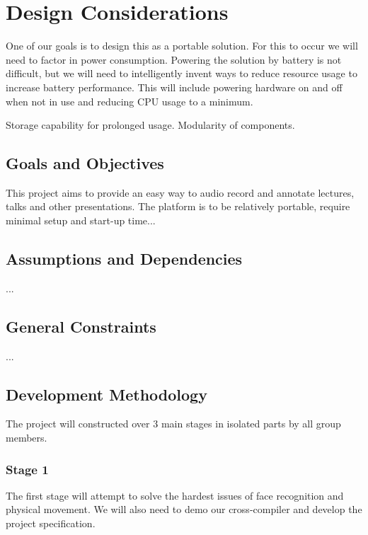 \documentclass[11pt,a4paper,titlepage]{report}
\begin{document}
\section{Design Considerations}

One of our goals is to design this as a portable solution. For this to occur we will need to factor in power consumption. Powering the solution by battery is not difficult, but we will need to intelligently invent ways to reduce resource usage to increase battery performance. This will include powering hardware on and off when not in use and reducing CPU usage to a minimum. 

Storage capability for prolonged usage. Modularity of components.


\subsection{Goals and Objectives}

This project aims to provide an easy way to audio record and annotate lectures, talks and other presentations. The platform is to be relatively portable, require minimal setup and start-up time...

\subsection{Assumptions and Dependencies}

...

\subsection{General Constraints}

...

\subsection{Development Methodology}

The project will constructed over 3 main stages in isolated parts by all group members. 


\subsubsection{Stage 1}

The first stage will attempt to solve the hardest issues of face recognition and physical movement. We will also need to demo our cross-compiler and develop the project specification.
\end{document}
